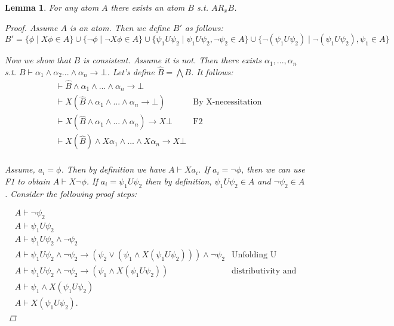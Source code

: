 \documentclass[11pt]{article}
\newtheorem{lemma}[theorem]{Lemma}
\theoremstyle{definition}
\theoremstyle{remark}
\begin{document}
\begin{lemma}

For any atom $A$ there exists an atom $B$ s.t. $A R_x B$.

\begin{proof}
    Assume $A$ is an atom. Then we define $B'$ as follows: 
    \[
        B' = \{ \phi \mid X \phi \in A\} \cup \{ \neg \phi \mid \neg X \phi \in A\} \cup \{\psi_1 U \psi_2 \mid \psi_1 U \psi_2, \neg \psi_2 \in A\}
        \cup \{   \neg(\psi_1 U \psi_2) \mid \neg(\psi_1 U \psi_2), \psi_1 \in A  \}
    \] 

    Now we show that $B$ is consistent. Assume it is not. Then there exists $\alpha_1,..., \alpha_n$ s.t.
    $B \vdash \alpha_1 \land \alpha_2 ... \land \alpha_n \rightarrow \bot$. 
    Let's define $\hat{B} = \bigwedge B$. It follows:
    \[
        \begin{array}{rll} 
            & \vdash \hat{B} \land \alpha_1 \land ... \land\alpha_n  \rightarrow \bot \\
            & \vdash X(\hat{B} \land \alpha_1 \land ... \land\alpha_n  \rightarrow \bot )
            & \text{By X-necessitation} \\
            & \vdash X(\hat{B} \land \alpha_1 \land ... \land\alpha_n ) \rightarrow X \bot
            & \text{F2} \\
            & \vdash X(\hat{B}) \land X\alpha_1 \land ... \land X\alpha_n \rightarrow X \bot \\
        \end{array}
    \]

    Assume, $a_i = \phi$. Then by definition we have $A \vdash Xa_i$. If $a_i = \neg \phi$, then
    we can use F1 to obtain $A \vdash X \neg \phi$. If $a_i = \psi_1 U \psi_2$ then 
    by definition, $\psi_1 U \psi_2 \in A$ and $\neg \psi_2 \in A$. Consider the following proof steps:

       \[
        \begin{array}{rll} 
            & A \vdash \neg \psi_2 \\
            & A \vdash \psi_1 U \psi_2 \\
            & A \vdash \psi_1 U \psi_2 \land \neg \psi_2 \\
            & A \vdash \psi_1 U \psi_2 \land \neg \psi_2 \rightarrow (\psi_2 \lor (\psi_1 \land X ( \psi_1 U \psi_2 ))) \land \neg \psi_2 
            & \text{Unfolding U} \\
            & A \vdash  \psi_1 U \psi_2 \land \neg \psi_2 \rightarrow (\psi_1 \land X(\psi_1 U \psi_2))
            & \text{distributivity and other rules} \\
            & A \vdash \psi_1 \land X(\psi_1 U \psi_2) \\
            & A \vdash X(\psi_1 U \psi_2).


\end{array}\]
\end{proof}
\end{lemma}
\end{document}
